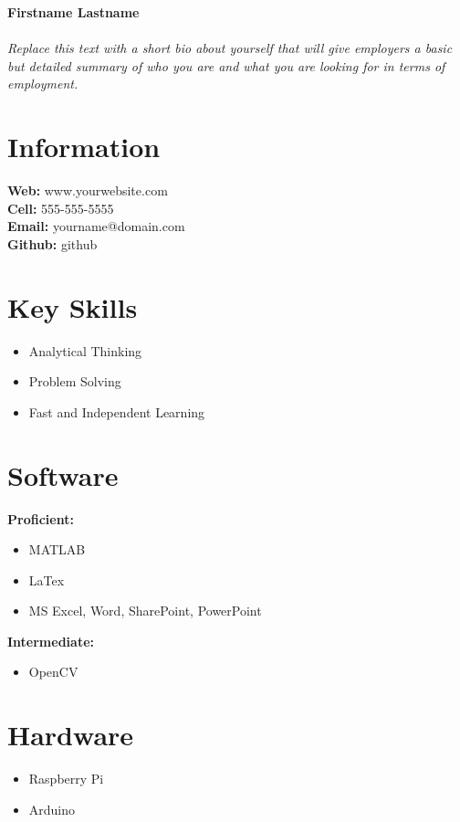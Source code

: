 \documentclass{article}
\begin{document}
{\selectfont

\begin{center}
\textbf{\huge Firstname Lastname}\\
\textbf{          }\\
\textit{Replace this text with a short bio about yourself that will give employers a basic but detailed summary of who you are and what you are looking for in terms of employment.}
\end{center}


\begin{minipage}[t]{0.3\textwidth}
\section*{Information}
\textbf{Web:} www.yourwebsite.com\\
\textbf{Cell:} 555-555-5555\\
\textbf{Email:} yourname@domain.com\\
\textbf{Github:} github
\section*{Key Skills}
\begin{itemize}
\item Analytical Thinking
\item Problem Solving
\item Fast and Independent Learning
\end{itemize}
\section*{Software}
\textbf{Proficient:}
\begin{itemize}
\item MATLAB
\item LaTex
\item MS Excel, Word, SharePoint, PowerPoint
\end{itemize}
\textbf{Intermediate:}
\begin{itemize}
\item OpenCV
\end{itemize}
\section*{Hardware}
\begin{itemize}
\item Raspberry Pi
\item Arduino
\end{itemize}

\end{minipage}}
\end{document}
